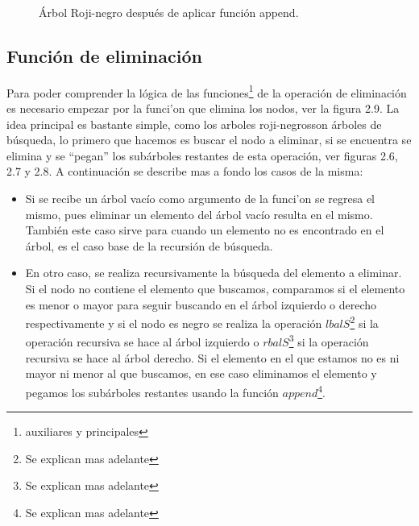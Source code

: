 \documentclass[letterpaper,12pt,oneside]{book}
\newcommand{\Arn}{Árbol Roji-negro}
\newcommand{\arns}{arboles roji-negros}
\theoremstyle{plain}
\theoremstyle{definition}
\theoremstyle{remark}
\begin{document}
\begin{figure}
\centering 
\captionsetup{justification=centering}
\label{arbolRB}
\caption{{\Arn} después de aplicar función append.}
\end{figure}

\subsection{Funci\'on de eliminaci\'on}

Para poder comprender la l\'ogica de las funciones\footnote{auxiliares y principales} de la operaci\'on
de eliminaci\'on es necesario empezar por la funci'on que elimina los nodos, ver la figura 2.9. La idea 
principal es bastante simple, como los \arns son \'arboles de búsqueda, lo primero que hacemos es buscar 
el nodo a eliminar, si se encuentra se elimina y se ``pegan'' los subárboles restantes de esta 
operaci\'on, ver figuras 2.6, 2.7 y 2.8. A continuaci\'on se describe mas a fondo los casos de la misma:

\begin{itemize}
    \item Si se recibe un \'arbol vacío como argumento de la funci'on se regresa el mismo, pues eliminar 
    un elemento del \'arbol vacío resulta en el mismo. También este caso sirve para cuando un elemento no
    es encontrado en el \'arbol, es el caso base de la recursi\'on de búsqueda.
    \item En otro caso, se realiza recursivamente la búsqueda del elemento a eliminar. Si el nodo no 
    contiene el elemento que buscamos, comparamos si el elemento es menor o mayor para seguir buscando en
    el \'arbol izquierdo o derecho respectivamente y si el nodo es negro se realiza la operaci\'on 
    $lbalS$\footnote{Se explican mas adelante} si la operación recursiva se hace al árbol izquierdo o 
    $rbalS$\footnote{Se explican mas adelante} si la operación recursiva se hace al árbol derecho. Si el 
    elemento en el que estamos no es ni mayor ni menor al que buscamos, en ese caso eliminamos el 
    elemento y pegamos los subárboles restantes usando la función $append$\footnote{Se explican mas 
    adelante}.
\end{itemize}
\end{document}

